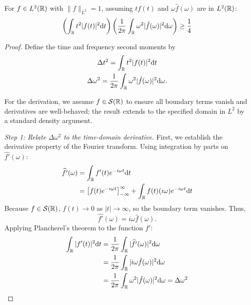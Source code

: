 \begin{theorem}
For $f \in L^2(\mathbb{R})$ with $\|f\|_{L^2}=1$, assuming $tf(t)$ and $\omega \hat{f}(\omega)$ are in $L^2(\mathbb{R})$:
\begin{equation}
\left( \int_{\mathbb{R}} t^2 |f(t)|^2 \mathrm{d} t \right) \left( \frac{1}{2\pi} \int_{\mathbb{R}} \omega^2 |\hat{f}(\omega)|^2 \mathrm{d} \omega \right) \geq \frac{1}{4}
\end{equation}

\end{theorem}

\begin{proof}
Define the time and frequency second moments by
\[
\begin{gathered}
\Delta t^2 = \int_{\mathbb{R}} t^2 |f(t)|^2 \mathrm{d} t \\
\Delta \omega^2 = \frac{1}{2\pi} \int_{\mathbb{R}} \omega^2 |\hat{f}(\omega)|^2 \mathrm{d} \omega.
\end{gathered}
\]

For the derivation, we assume $f \in \mathcal{S}(\mathbb{R})$ to ensure all boundary terms vanish and derivatives are well-behaved; the result extends to the specified domain in $L^2$ by a standard density argument.

\textit{Step 1: Relate $\Delta \omega^2$ to the time-domain derivative.}
First, we establish the derivative property of the Fourier transform. Using integration by parts on $\widehat{f'}(\omega)$:
\begin{equation}
\begin{aligned}
    \widehat{f'}(\omega)
    &= \int_{\mathbb{R}} f'(t) e^{-i\omega t} \mathrm{d} t \\
    &= \left[ f(t) e^{-i\omega t} \right]_{-\infty}^\infty
    + \int_{\mathbb{R}} f(t) (i\omega) e^{-i\omega t} \mathrm{d} t
    \end{aligned}
\end{equation}
Because $f \in \mathcal{S}(\mathbb{R})$, $f(t) \to 0$ as $|t| \to \infty$, so the boundary term vanishes. Thus,
\[
\widehat{f'}(\omega) = i\omega \hat{f}(\omega).
\]
Applying Plancherel's theorem to the function $f'$:
\begin{equation}
\begin{aligned}
    \int_{\mathbb{R}} |f'(t)|^2 \mathrm{d} t
    &= \frac{1}{2\pi} \int_{\mathbb{R}} |\widehat{f'}(\omega)|^2 \mathrm{d} \omega \\
    &= \frac{1}{2\pi} \int_{\mathbb{R}} |i\omega \hat{f}(\omega)|^2 \mathrm{d} \omega \\
    &= \frac{1}{2\pi} \int_{\mathbb{R}} \omega^2 |\hat{f}(\omega)|^2 \mathrm{d} \omega
    = \Delta \omega^2
    \end{aligned}
\end{equation}


\end{proof}
